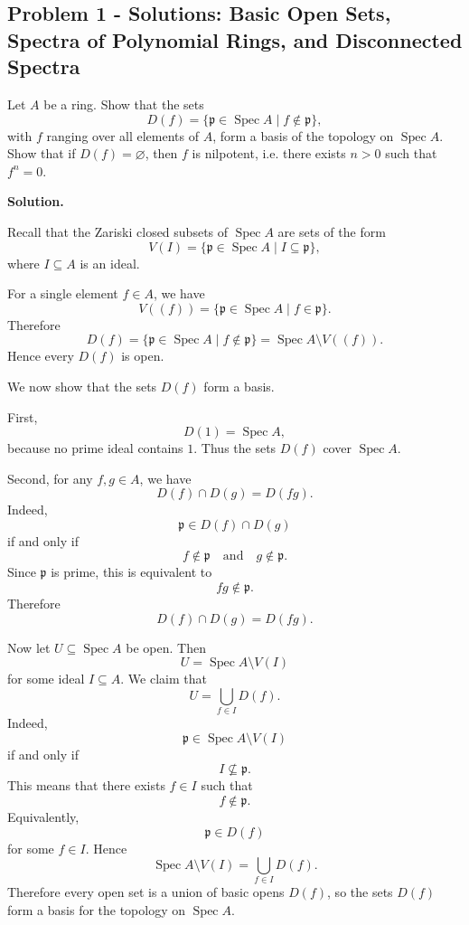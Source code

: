 
\subsection*{Problem 1 - Solutions: Basic Open Sets, Spectra of Polynomial Rings, and Disconnected Spectra}
	
	Let \(A\) be a ring. Show that the sets
	\[
	D(f)=\{\mathfrak p\in \operatorname{Spec} A \mid f\notin \mathfrak p\},
	\]
	with \(f\) ranging over all elements of \(A\), form a basis of the topology on
	\(\operatorname{Spec} A\). Show that if \(D(f)=\varnothing\), then \(f\) is nilpotent, i.e. there
	exists \(n>0\) such that \(f^n=0\).
	
	\bigskip
	
	\textbf{Solution.}
	
	Recall that the Zariski closed subsets of \(\operatorname{Spec} A\) are sets of the form
	\[
	V(I)=\{\mathfrak p\in \operatorname{Spec} A \mid I\subseteq \mathfrak p\},
	\]
	where \(I\subseteq A\) is an ideal.
	
	For a single element \(f\in A\), we have
	\[
	V((f))=\{\mathfrak p\in \operatorname{Spec} A \mid f\in \mathfrak p\}.
	\]
	Therefore
	\[
	D(f)=\{\mathfrak p\in \operatorname{Spec} A \mid f\notin \mathfrak p\}
	=\operatorname{Spec} A\setminus V((f)).
	\]
	Hence every \(D(f)\) is open.
	
	We now show that the sets \(D(f)\) form a basis.
	
	First,
	\[
	D(1)=\operatorname{Spec} A,
	\]
	because no prime ideal contains \(1\). Thus the sets \(D(f)\) cover \(\operatorname{Spec} A\).
	
	Second, for any \(f,g\in A\), we have
	\[
	D(f)\cap D(g)=D(fg).
	\]
	Indeed,
	\[
	\mathfrak p\in D(f)\cap D(g)
	\]
	if and only if
	\[
	f\notin \mathfrak p
	\quad\text{and}\quad
	g\notin \mathfrak p.
	\]
	Since \(\mathfrak p\) is prime, this is equivalent to
	\[
	fg\notin \mathfrak p.
	\]
	Therefore
	\[
	D(f)\cap D(g)=D(fg).
	\]
	
	Now let \(U\subseteq \operatorname{Spec} A\) be open. Then
	\[
	U=\operatorname{Spec} A\setminus V(I)
	\]
	for some ideal \(I\subseteq A\). We claim that
	\[
	U=\bigcup_{f\in I}D(f).
	\]
	Indeed,
	\[
	\mathfrak p\in \operatorname{Spec} A\setminus V(I)
	\]
	if and only if
	\[
	I\not\subseteq \mathfrak p.
	\]
	This means that there exists \(f\in I\) such that
	\[
	f\notin \mathfrak p.
	\]
	Equivalently,
	\[
	\mathfrak p\in D(f)
	\]
	for some \(f\in I\). Hence
	\[
	\operatorname{Spec} A\setminus V(I)=\bigcup_{f\in I}D(f).
	\]
	Therefore every open set is a union of basic opens \(D(f)\), so the sets \(D(f)\)
	form a basis for the topology on \(\operatorname{Spec} A\).
	
